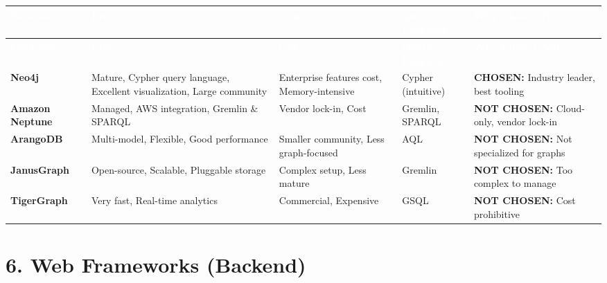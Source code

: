 \documentclass[12pt,a4paper,landscape]{article}
\begin{document}
\begin{longtable}{|p{2.5cm}|p{3cm}|p{3cm}|p{3cm}|p{4cm}|}
\hline
\rowcolor{headercolor}
\textcolor{white}{\textbf{Database}} & 
\textcolor{white}{\textbf{Pros}} & 
\textcolor{white}{\textbf{Cons}} & 
\textcolor{white}{\textbf{Query Language}} & 
\textcolor{white}{\textbf{Why Chosen/Not}} \\
\hline
\endfirsthead

\hline
\rowcolor{headercolor}
\textcolor{white}{\textbf{Database}} & 
\textcolor{white}{\textbf{Pros}} & 
\textcolor{white}{\textbf{Cons}} & 
\textcolor{white}{\textbf{Query Language}} & 
\textcolor{white}{\textbf{Why Chosen/Not}} \\
\hline
\endhead

\rowcolor{rowcolor1}
\textbf{Neo4j} & 
Mature, Cypher query language, Excellent visualization, Large community & 
Enterprise features cost, Memory-intensive & 
Cypher (intuitive) & 
\textbf{CHOSEN:} Industry leader, best tooling \\
\hline

\rowcolor{rowcolor2}
\textbf{Amazon Neptune} & 
Managed, AWS integration, Gremlin \& SPARQL & 
Vendor lock-in, Cost & 
Gremlin, SPARQL & 
\textbf{NOT CHOSEN:} Cloud-only, vendor lock-in \\
\hline

\rowcolor{rowcolor1}
\textbf{ArangoDB} & 
Multi-model, Flexible, Good performance & 
Smaller community, Less graph-focused & 
AQL & 
\textbf{NOT CHOSEN:} Not specialized for graphs \\
\hline

\rowcolor{rowcolor2}
\textbf{JanusGraph} & 
Open-source, Scalable, Pluggable storage & 
Complex setup, Less mature & 
Gremlin & 
\textbf{NOT CHOSEN:} Too complex to manage \\
\hline

\rowcolor{rowcolor1}
\textbf{TigerGraph} & 
Very fast, Real-time analytics & 
Commercial, Expensive & 
GSQL & 
\textbf{NOT CHOSEN:} Cost prohibitive \\
\hline
\end{longtable}

\section*{6. Web Frameworks (Backend)}
\end{document}
